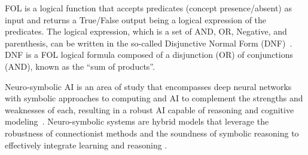 FOL is a logical function
that accepts predicates (concept presence/absent) as input and returns a True/False output being a
logical expression of the predicates. The logical expression, which is a set of AND, OR, Negative,
and parenthesis, can be written in the so-called Disjunctive Normal Form (DNF)~\cite{mendelson2009introduction}. DNF is a FOL logical formula composed of a disjunction (OR) of conjunctions (AND), known as the ``sum of products''. 

Neuro-symbolic AI is an area of study that encompasses deep neural
networks with symbolic approaches to computing and AI to complement
the strengths and weaknesses of each, resulting in a robust AI capable
of reasoning and cognitive modeling~\cite{belle2020symbolic}.
Neuro-symbolic systems are hybrid models that leverage the robustness
of connectionist methods and the soundness of symbolic reasoning to
effectively integrate learning and reasoning
\cite{garcez2015neural,besold2017neural}. 